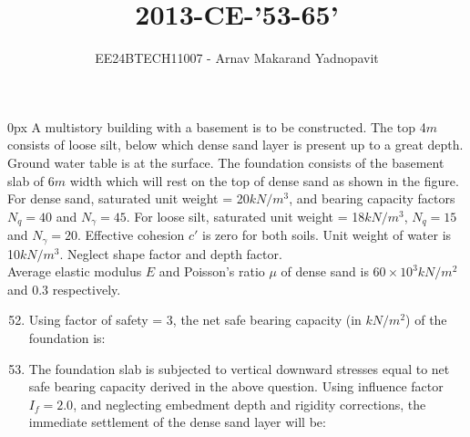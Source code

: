 \documentclass[journal,12pt,onecolumn]{IEEEtran}
\theoremstyle{remark}
\begin{document}
\title{2013-CE-'53-65'}
\author{EE24BTECH11007 - Arnav Makarand Yadnopavit}
\maketitle
\renewcommand{\thefigure}{\theenumi}
\renewcommand{\thetable}{\theenumi}
\parindent 0px A multistory building with a basement is to be constructed. The top 4$m$ consists of loose silt, below which dense sand layer is present up to a great depth. Ground water table is at the surface. The foundation consists of the basement slab of 6$m$ width which will rest on the top of dense sand as shown in the figure. For dense sand, saturated unit weight = 20$kN/m^3$, and bearing capacity factors $N_q = 40$ and $N_\gamma = 45$. For loose silt, saturated unit weight = 18$kN/m^3$, $N_q = 15$ and $N_\gamma = 20$. Effective cohesion $c\prime$ is zero for both soils. Unit weight of water is 10$kN/m^3$. Neglect shape factor and depth factor.\\
Average elastic modulus $E$ and Poisson's ratio $\mu$ of dense sand is $60\times10^3kN/m^2$ and 0.3 respectively.
\begin{figure}[H]
\centering

\end{figure}
\begin{enumerate}
\setcounter{enumi}{51}
\item Using factor of safety = 3, the net safe bearing capacity (in $kN/m^2$) of the foundation is:
\begin{enumerate}
\end{enumerate}
\item The foundation slab is subjected to vertical downward stresses equal to net safe bearing capacity derived in the above question. Using influence factor $I_f=2.0$, and neglecting embedment depth and rigidity corrections, the immediate settlement of the dense sand layer will be:
\begin{enumerate}
\end{enumerate}
\end{enumerate}
\end{document}
